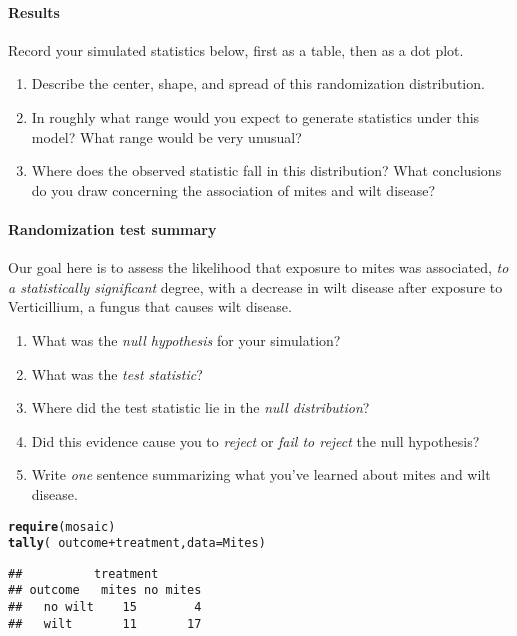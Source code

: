 \documentclass[10pt]{article}\usepackage[]{graphicx}\usepackage[]{color}
\makeatletter
\newcommand{\hlopt}[1]{\textcolor[rgb]{0,0,0}{#1}}%
\newcommand{\hlstd}[1]{\textcolor[rgb]{0.345,0.345,0.345}{#1}}%
\newcommand{\hlkwc}[1]{\textcolor[rgb]{0.333,0.667,0.333}{#1}}%
\newcommand{\hlkwd}[1]{\textcolor[rgb]{0.737,0.353,0.396}{\textbf{#1}}}%
\newenvironment{kframe}{%
 \def\at@end@of@kframe{}%
 \ifinner\ifhmode%
  \def\at@end@of@kframe{\end{minipage}}%
  \begin{minipage}{\columnwidth}%
 \fi\fi%
 \def\FrameCommand##1{\hskip\@totalleftmargin \hskip-\fboxsep
 \colorbox{shadecolor}{##1}\hskip-\fboxsep
     \hskip-\linewidth \hskip-\@totalleftmargin \hskip\columnwidth}%
 \MakeFramed {\advance\hsize-\width
   \@totalleftmargin\z@ \linewidth\hsize
   \@setminipage}}%
 {\par\unskip\endMakeFramed%
 \at@end@of@kframe}
\newenvironment{knitrout}{}{} %
\makeatother
\begin{document}
\vspace{0.5in}

\paragraph{Results}
Record your simulated statistics below, first as a table, then as a dot plot.

\vspace{3.5in}

\begin{enumerate}
  \itemsep1in
  \item Describe the center, shape, and spread of this randomization distribution.
  \item In roughly what range would you expect to generate statistics under this model?  What range would be very unusual?
  \item Where does the observed statistic fall in this distribution?  What conclusions do you draw concerning the association of mites and wilt disease?
  \vspace{1in}
\end{enumerate}


\clearpage
\paragraph{Randomization test summary}

Our goal here is to assess the likelihood that exposure to mites was associated, \emph{to a statistically significant} degree, with a decrease in wilt disease after exposure to Verticillium, a fungus that causes wilt disease. 

\begin{enumerate}
  \itemsep0.75in
  \item What was the \emph{null hypothesis} for your simulation?
  \item What was the \emph{test statistic}?
  \item Where did the test statistic lie in the \emph{null distribution}? 
  \item Did this evidence cause you to \emph{reject} or \emph{fail to reject} the null hypothesis?
  \item Write \emph{one} sentence summarizing what you've learned about mites and wilt disease.  
  \vspace{0.5in}
\end{enumerate}

\begin{knitrout}
\color{fgcolor}\begin{kframe}
\begin{alltt}
\hlkwd{require}\hlstd{(mosaic)}
\hlkwd{tally}\hlstd{(}\hlopt{~} \hlstd{outcome} \hlopt{+} \hlstd{treatment,} \hlkwc{data} \hlstd{= Mites)}
\end{alltt}
\begin{verbatim}
##          treatment
## outcome   mites no mites
##   no wilt    15        4
##   wilt       11       17
\end{verbatim}
\end{kframe}
\end{knitrout}
\end{document}
